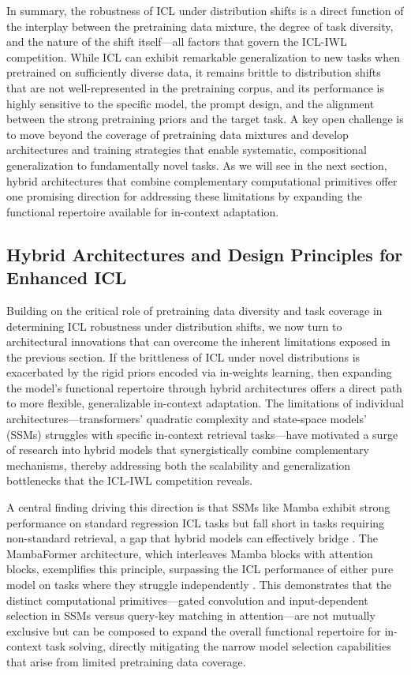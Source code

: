 \documentclass[11pt]{article}
\begin{document}
In summary, the robustness of ICL under distribution shifts is a direct function of the interplay between the pretraining data mixture, the degree of task diversity, and the nature of the shift itself---all factors that govern the ICL-IWL competition. While ICL can exhibit remarkable generalization to new tasks when pretrained on sufficiently diverse data, it remains brittle to distribution shifts that are not well-represented in the pretraining corpus, and its performance is highly sensitive to the specific model, the prompt design, and the alignment between the strong pretraining priors and the target task. A key open challenge is to move beyond the coverage of pretraining data mixtures and develop architectures and training strategies that enable systematic, compositional generalization to fundamentally novel tasks. As we will see in the next section, hybrid architectures that combine complementary computational primitives offer one promising direction for addressing these limitations by expanding the functional repertoire available for in-context adaptation.

\subsection{Hybrid Architectures and Design Principles for Enhanced ICL}

Building on the critical role of pretraining data diversity and task coverage in determining ICL robustness under distribution shifts, we now turn to architectural innovations that can overcome the inherent limitations exposed in the previous section. If the brittleness of ICL under novel distributions is exacerbated by the rigid priors encoded via in-weights learning, then expanding the model's functional repertoire through hybrid architectures offers a direct path to more flexible, generalizable in-context adaptation. The limitations of individual architectures---transformers' quadratic complexity and state-space models' (SSMs) struggles with specific in-context retrieval tasks---have motivated a surge of research into hybrid models that synergistically combine complementary mechanisms, thereby addressing both the scalability and generalization bottlenecks that the ICL-IWL competition reveals.

A central finding driving this direction is that SSMs like Mamba exhibit strong performance on standard regression ICL tasks but fall short in tasks requiring non-standard retrieval, a gap that hybrid models can effectively bridge \cite{ref88}. The MambaFormer architecture, which interleaves Mamba blocks with attention blocks, exemplifies this principle, surpassing the ICL performance of either pure model on tasks where they struggle independently \cite{ref88}. This demonstrates that the distinct computational primitives---gated convolution and input-dependent selection in SSMs versus query-key matching in attention---are not mutually exclusive but can be composed to expand the overall functional repertoire for in-context task solving, directly mitigating the narrow model selection capabilities that arise from limited pretraining data coverage.
\end{document}
